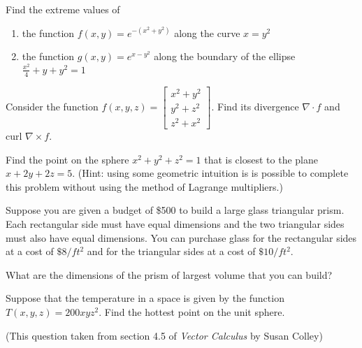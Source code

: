 \item

Find the extreme values of
\begin{enumerate}
 \item the function
  $f(x,y) = e^{-(x^2+y^2)}$
  along the curve $x = y^2$
 \item the function
  $g(x,y) = e^{x-y^2}$ along the boundary of the ellipse
  $\frac{x^2}{4}+y+y^2=1$
\end{enumerate}

\item

Consider the function $f(x,y,z) = \begin{bmatrix}
                                   x^2 + y^2 \\
                                   y^2 + z^2 \\
                                   z^2 + x^2
                                  \end{bmatrix}$.
Find its divergence $\nabla \cdot f$ and curl $\nabla \times f$.

\item

Find the point on the sphere $x^2 + y^2 + z^2 = 1$ that is closest
to the plane $x + 2y + 2z = 5$. (Hint: using some geometric intuition
is is possible to complete this problem without using the method of
Lagrange multipliers.)

\item
{}

Suppose you are given a budget of \$500 to build a large glass
triangular prism.  Each rectangular side must have equal dimensions
and the two triangular sides must also have equal dimensions.  You
can purchase glass for the rectangular sides at a cost of $\$8/ft^2$
and for the triangular sides at a cost of $\$10/ft^2$.

What are the dimensions of the prism of largest volume that you can build?

\item
{}

Suppose that the temperature in a space is given by the function
$T(x,y,z) = 200xyz^2$.  Find the hottest point on the unit sphere.

(This question taken from section 4.5 of {\it Vector Calculus} by Susan Colley)

\EEN

